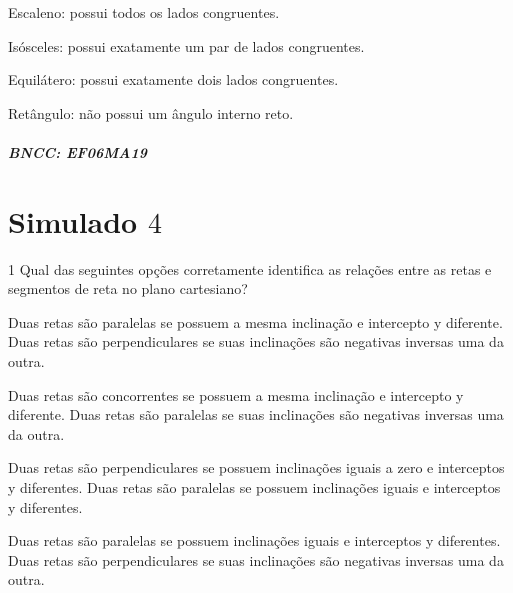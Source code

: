 {\begin{escolha}
\item Escaleno: possui todos os lados congruentes.
\item Isósceles: possui exatamente um par de lados congruentes.
\item Equilátero: possui exatamente dois lados congruentes.
\item Retângulo: não possui um ângulo interno reto.
\end{escolha}

\paragraph{BNCC: EF06MA19 }


\chapter{Simulado $4$}

\num{1}  Qual das seguintes opções corretamente identifica as relações entre
as retas e segmentos de reta no plano cartesiano?

\begin{escolha}
\item Duas retas são paralelas se possuem a mesma inclinação e intercepto y
diferente. Duas retas são perpendiculares se suas inclinações são
negativas inversas uma da outra.
\item Duas retas são concorrentes se possuem a mesma inclinação e
intercepto y diferente. Duas retas são paralelas se suas inclinações são
negativas inversas uma da outra.
\item Duas retas são perpendiculares se possuem inclinações iguais a zero e
interceptos y diferentes. Duas retas são paralelas se possuem
inclinações iguais e interceptos y diferentes.
\item Duas retas são paralelas se possuem inclinações iguais e interceptos
y diferentes. Duas retas são perpendiculares se suas inclinações são
negativas inversas uma da outra.
\end{escolha}

}
